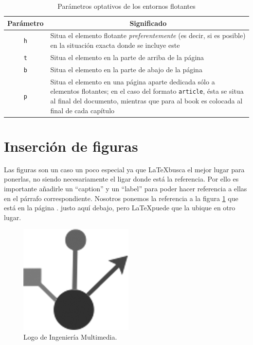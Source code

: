 \begin{table}
\begin{center}
\begin{tabular}{|c|p{}|}
\hline
Parámetro & \multicolumn{1}{c|}{Significado} \\ \hline
\texttt{h} & Situa el elemento flotante \emph{preferentemente}
(es decir, si es posible) en la situación exacta donde se incluye este \\
\texttt{t} & Situa el elemento en la parte de arriba de la página \\
\texttt{b} & Situa el elemento en la parte de abajo de la página \\
\texttt{p} & Situa el elemento en una página aparte dedicada sólo a
elementos flotantes; en el caso del formato \texttt{article},
ésta se situa al final del documento, mientras que para al book es
colocada al final de cada capítulo \\ \hline
\end{tabular}
\end{center}
\caption{Parámetros optativos de los entornos flotantes}
\label{tabla_parametros}
\end{table}



\section{Inserción de figuras}

Las figuras son un caso un poco especial ya que \LaTeX busca el mejor lugar para ponerlas, no siendo necesariamente el ligar donde está la referencia. Por ello es importante añadirle un ``caption'' y un ``label'' para poder hacer referencia a ellas en el párrafo correspondiente. Nosotros ponemos la referencia a la figura \ref{logo_im} que está en la página \pageref{logo_im}. justo aquí debajo, pero \LaTeX puede que la ubique en otro lugar.

\begin{figure}
\begin{center}
\includegraphics[scale=0.25]{imagenes/logoim.jpg}
\caption{Logo de Ingeniería  Multimedia.}
\label{logo_im}
\end{center}
\end{figure}


